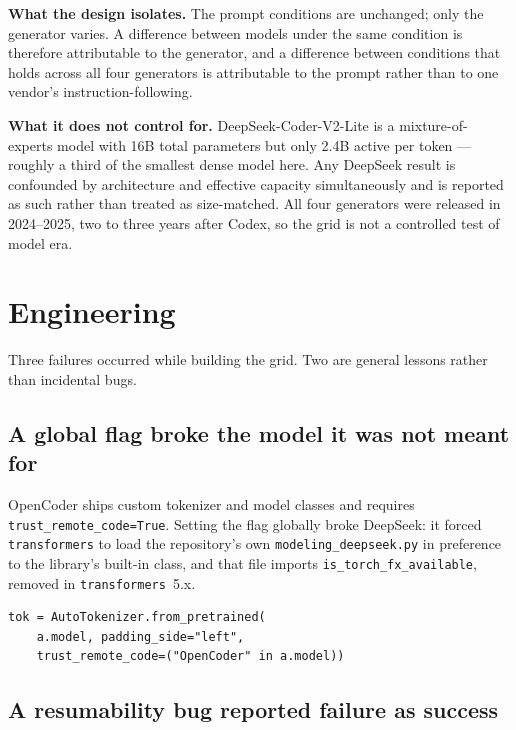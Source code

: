 \documentclass[12pt,a4paper,oneside]{report}
\begin{document}
\textbf{What the design isolates.} The prompt conditions are unchanged; only the
generator varies. A difference between models under the same condition is therefore
attributable to the generator, and a difference between conditions that holds across
all four generators is attributable to the prompt rather than to one vendor's
instruction-following.

\textbf{What it does not control for.} DeepSeek-Coder-V2-Lite is a mixture-of-experts
model with 16B total parameters but only 2.4B active per token --- roughly a third of
the smallest dense model here. Any DeepSeek result is confounded by architecture and
effective capacity simultaneously and is reported as such rather than treated as
size-matched. All four generators were released in 2024--2025, two to three years
after Codex, so the grid is not a controlled test of model era.

\section{Engineering}

Three failures occurred while building the grid. Two are general lessons rather than
incidental bugs.

\subsection{A global flag broke the model it was not meant for}

OpenCoder ships custom tokenizer and model classes and requires
\texttt{trust\_remote\_code=True}. Setting the flag globally broke DeepSeek: it forced
\texttt{transformers} to load the repository's own \texttt{modeling\_deepseek.py} in
preference to the library's built-in class, and that file imports
\texttt{is\_torch\_fx\_available}, removed in \texttt{transformers}~5.x.

\begin{lstlisting}[caption={The flag is made conditional on the model identifier
rather than applied uniformly (D15).}]
tok = AutoTokenizer.from_pretrained(
    a.model, padding_side="left",
    trust_remote_code=("OpenCoder" in a.model))
\end{lstlisting}

\subsection{A resumability bug reported failure as success}
\end{document}
